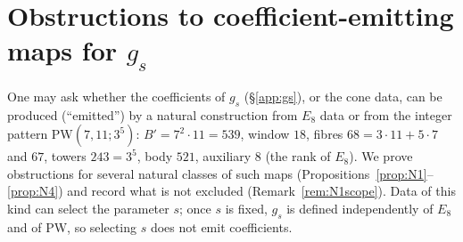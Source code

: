 \section{Obstructions to coefficient-emitting maps for $g_s$}\label{sec:emit}
One may ask whether the coefficients of $g_s$ (\S\ref{app:gs}), or the cone data, can be produced (``emitted'') by a natural construction from $E_8$ data or
from the integer pattern PW$(7,11;3^5)$: $B'=7^2\cdot11=539$, window $18$, fibres $68=3\cdot11+5\cdot7$ and $67$, towers $243=3^5$, body $521$, auxiliary $8$
(the rank of $E_8$). We prove obstructions for several natural classes of such maps (Propositions~\ref{prop:N1}--\ref{prop:N4}) and record what is not excluded
(Remark~\ref{rem:N1scope}). Data of this kind can select the parameter $s$; once $s$ is fixed, $g_s$ is defined independently of $E_8$ and of PW, so
selecting $s$ does not emit coefficients.

